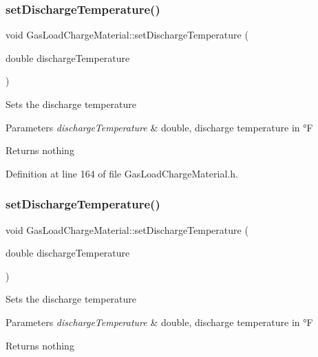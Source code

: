 \subsubsection{\texorpdfstring{set\+Discharge\+Temperature()}{setDischargeTemperature()}\hspace{0.1cm}{\footnotesize\ttfamily [1/3]}}
{\footnotesize\ttfamily void Gas\+Load\+Charge\+Material\+::set\+Discharge\+Temperature (\begin{DoxyParamCaption}\item[{double}]{discharge\+Temperature }\end{DoxyParamCaption})\hspace{0.3cm}{\ttfamily [inline]}}

Sets the discharge temperature


\begin{DoxyParams}{Parameters}
{\em discharge\+Temperature} & double, discharge temperature in °F\\
\hline
\end{DoxyParams}
\begin{DoxyReturn}{Returns}
nothing 
\end{DoxyReturn}


Definition at line 164 of file Gas\+Load\+Charge\+Material.\+h.

\mbox{\label{class_gas_load_charge_material_a6c53344d5370a1e9b7321a530a6843c0}} 
\subsubsection{\texorpdfstring{set\+Discharge\+Temperature()}{setDischargeTemperature()}\hspace{0.1cm}{\footnotesize\ttfamily [2/3]}}
{\footnotesize\ttfamily void Gas\+Load\+Charge\+Material\+::set\+Discharge\+Temperature (\begin{DoxyParamCaption}\item[{double}]{discharge\+Temperature }\end{DoxyParamCaption})\hspace{0.3cm}{\ttfamily [inline]}}

Sets the discharge temperature


\begin{DoxyParams}{Parameters}
{\em discharge\+Temperature} & double, discharge temperature in °F\\
\hline
\end{DoxyParams}
\begin{DoxyReturn}{Returns}
nothing 
\end{DoxyReturn}


